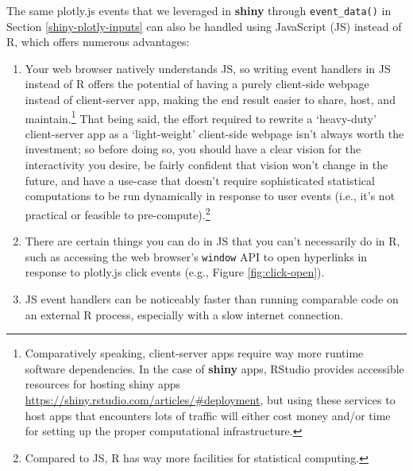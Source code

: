 \documentclass[
  12pt,
]{krantz}
\providecommand{\tightlist}{%
  \setlength{\itemsep}{0pt}\setlength{\parskip}{0pt}}
\begin{document}
The same plotly.js events that we leveraged in \textbf{shiny} through \texttt{event\_data()} in Section \ref{shiny-plotly-inputs} can also be handled using JavaScript (JS) instead of R, which offers numerous advantages:

\begin{enumerate}
\def\labelenumi{\arabic{enumi}.}
\tightlist
\item
  Your web browser natively understands JS, so writing event handlers in JS instead of R offers the potential of having a purely client-side webpage instead of client-server app, making the end result easier to share, host, and maintain.\footnote{Comparatively speaking, client-server apps require way more runtime software dependencies. In the case of \textbf{shiny} apps, RStudio provides accessible resources for hosting shiny apps \url{https://shiny.rstudio.com/articles/\#deployment}, but using these services to host apps that encounters lots of traffic will either cost money and/or time for setting up the proper computational infrastructure.} That being said, the effort required to rewrite a `heavy-duty' client-server app as a `light-weight' client-side webpage isn't always worth the investment; so before doing so, you should have a clear vision for the interactivity you desire, be fairly confident that vision won't change in the future, and have a use-case that doesn't require sophisticated statistical computations to be run dynamically in response to user events (i.e., it's not practical or feasible to pre-compute).\footnote{Compared to JS, R has way more facilities for statistical computing.}
\item
  There are certain things you can do in JS that you can't necessarily do in R, such as accessing the web browser's \texttt{window} API to open hyperlinks in response to plotly.js click events (e.g., Figure \ref{fig:click-open}).
\item
  JS event handlers can be noticeably faster than running comparable code on an external R process, especially with a slow internet connection.
\end{enumerate}
\end{document}
